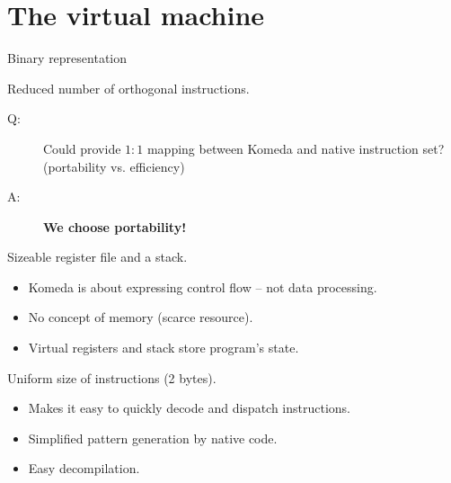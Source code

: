 \documentclass[10pt]{beamer}
\begin{document}
\section{The virtual machine}

\begin{frame}{Binary representation}
  \begin{block}{Reduced number of orthogonal instructions.}
    \begin{description}
      \item[Q:] Could provide $1:1$ mapping between Komeda and native
        instruction set? (portability vs. efficiency)
      \item[A:] {\bf We choose portability!}
    \end{description}
  \end{block}

  \begin{block}{Sizeable register file and a stack.}
    \begin{itemize}
      \item Komeda is about expressing control flow -- not data processing.
      \item No concept of memory (scarce resource).
      \item Virtual registers and stack store program's state.
    \end{itemize}
  \end{block}

  \begin{block}{Uniform size of instructions (2 bytes).}
    \begin{itemize}
      \item Makes it easy to quickly decode and dispatch instructions.
      \item Simplified pattern generation by native code.
      \item Easy decompilation.
    \end{itemize}
  \end{block}
\end{frame}
\end{document}
